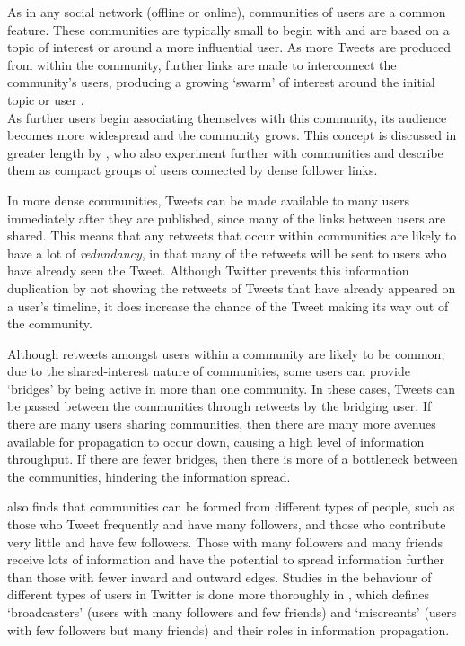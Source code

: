 As in any social network (offline or online), communities of users are a common feature. These communities are typically small to begin with and are based on a topic of interest or around a more influential user. As more Tweets are produced from within the community, further links are made to interconnect the community's users, producing a growing `swarm' of interest around the initial topic or user \cite{java07}. \\
As further users begin associating themselves with this community, its audience becomes more widespread and the community grows. This concept is discussed in greater length by \cite{java07}, who also experiment further with communities and describe them as compact groups of users connected by dense follower links.

In more dense communities, Tweets can be made available to many users immediately after they are published, since many of the links between users are shared. This means that any retweets that occur within communities are likely to have a lot of \textit{redundancy}, in that many of the retweets will be sent to users who have already seen the Tweet. Although Twitter prevents this information duplication by not showing the retweets of Tweets that have already appeared on a user's timeline, it does increase the chance of the Tweet making its way out of the community.

Although retweets amongst users within a community are likely to be common, due to the shared-interest nature of communities, some users can provide `bridges' by being active in more than one community. In these cases, Tweets can be passed between the communities through retweets by the bridging user. If there are many users sharing communities, then there are many more avenues available for propagation to occur down, causing a high level of information throughput. If there are fewer bridges, then there is more of a bottleneck between the communities, hindering the information spread.

\cite{java07} also finds that communities can be formed from different types of people, such as those who Tweet frequently and have many followers, and those who contribute very little and have few followers. Those with many followers and many friends receive lots of information and have the potential to spread information further than those with fewer inward and outward edges. Studies in the behaviour of different types of users in Twitter is done more thoroughly in \cite{krishnamurthy08}, which defines `broadcasters' (users with many followers and few friends) and `miscreants' (users with few followers but many friends) and their roles in information propagation.

